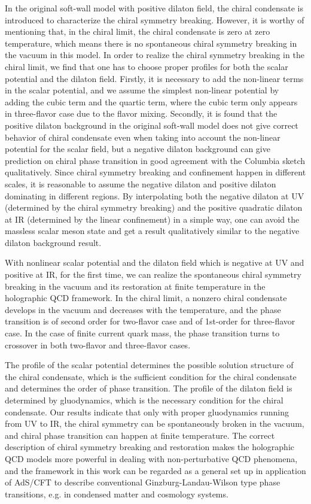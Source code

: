 \documentclass[aps,prd,showpacs,preprintnumbers,twocolumn]{revtex4}
\begin{document}
In the original soft-wall model with positive dilaton field, the chiral condensate is introduced to characterize the chiral symmetry breaking.
However, it is worthy of mentioning that, in the chiral limit, the chiral condensate is zero at zero temperature, which means there is no
spontaneous chiral symmetry breaking in the vacuum in this model. In order to realize the chiral symmetry breaking in the chiral limit, we
find that one has to choose proper profiles for both the scalar potential and the dilaton field. Firstly, it is necessary to add the non-linear
terms in the scalar potential, and we assume the simplest non-linear potential by adding the cubic term and the quartic term, where the
cubic term only appears in three-flavor case due to the flavor mixing. Secondly, it is found that the positive dilaton background in the original
soft-wall model does not give correct behavior of chiral condensate even when taking into account the non-linear potential for the scalar field,
but a negative dilaton background can give prediction on chiral phase transition in good agreement with the Columbia sketch qualitatively.
Since chiral symmetry breaking and confinement happen in different scales, it is reasonable to assume the negative dilaton and positive dilaton
dominating in different regions. By interpolating both the negative dilaton at UV (determined by the chiral symmetry breaking) and the positive
quadratic dilaton at IR (determined by the linear confinement) in a simple way, one can avoid the massless scalar meson state and get a result qualitatively
similar to the negative dilaton background result.

With nonlinear scalar potential and the dilaton field which is negative at UV and  positive at IR, for the first time,
we can realize the spontaneous chiral symmetry breaking in the vacuum and its restoration at finite temperature
in the holographic QCD framework.  In the chiral limit, a nonzero chiral condensate develops in the vacuum and
decreases with the temperature, and the phase transition is of second order for two-flavor case and of 1st-order for
three-flavor case. In the case of finite current quark mass, the phase transition turns to crossover in both two-flavor and
three-flavor cases.

The profile of the scalar potential determines the possible solution structure of the chiral condensate, which is the sufficient condition
for the chiral condensate and determines the order of phase transition. The profile of the dilaton field is determined by gluodynamics,
which is the necessary condition for the chiral condensate. Our results indicate that only with proper gluodynamics running from UV to IR,
the chiral symmetry can be spontaneously broken in the vacuum, and chiral phase transition can happen at finite temperature.
The correct description of chiral symmetry breaking and restoration makes the holographic QCD models more powerful in dealing
with non-perturbative QCD phenomena, and the framework in this work can be regarded as a general set up in application of
AdS/CFT to describe conventional Ginzburg-Landau-Wilson type phase transitions, e.g. in condensed matter and cosmology systems.
\end{document}
